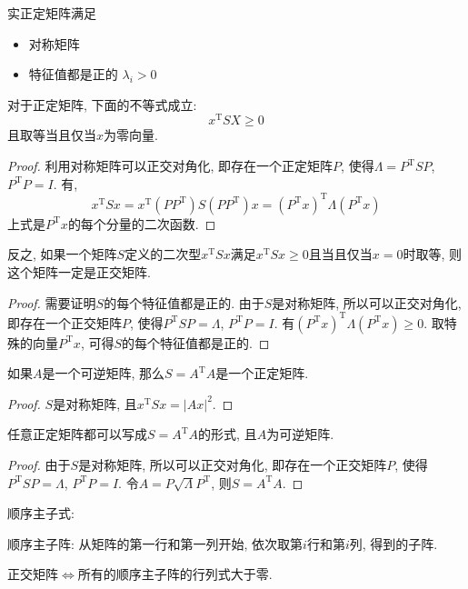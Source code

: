 
\begin{definition}
    实正定矩阵满足
    \begin{itemize}
        \item 对称矩阵
        \item 特征值都是正的 $\lambda_{i} > 0$
    \end{itemize}
\end{definition}

对于正定矩阵, 下面的不等式成立:
\begin{equation}
  x^{\mathrm{T}}SX \ge  0
\end{equation}
且取等当且仅当$x$为零向量.
\begin{proof}
    利用对称矩阵可以正交对角化, 即存在一个正定矩阵$P$, 使得$\Lambda = P^{\mathrm{T}}SP$, $P^{\mathrm{T}}P=I$.
    有,
    \begin{equation}
      x^{\mathrm{T}}Sx = x^{\mathrm{T}} \left( P P^{\mathrm{T}} \right) S \left( P P^{\mathrm{T}} \right) x = \left( P^{\mathrm{T}}x \right) ^{\mathrm{T}} \Lambda \left( P^{\mathrm{T}} x \right) 
    \end{equation}
    上式是$P^{\mathrm{T}}x$的每个分量的二次函数.
\end{proof}

反之, 如果一个矩阵$S$定义的二次型$x^{\mathrm{T}}Sx$满足$x^{\mathrm{T}}Sx \ge 0$且当且仅当$x=0$时取等, 则这个矩阵一定是正交矩阵.
\begin{proof}
    需要证明$S$的每个特征值都是正的. 由于$S$是对称矩阵, 所以可以正交对角化, 即存在一个正交矩阵$P$, 使得$P^{\mathrm{T}}SP = \Lambda$, $P^{\mathrm{T}}P=I$. 有$\left( P^{\mathrm{T}}x \right) ^{\mathrm{T}} \Lambda \left( P^{\mathrm{T}} x \right) \ge 0$. 取特殊的向量$
    P^{\mathrm{T}}x$, 可得$S$的每个特征值都是正的.
\end{proof}

\begin{proposition}
    如果$A$是一个可逆矩阵, 那么$S = A^{\mathrm{T}}A$是一个正定矩阵.
\end{proposition}
\begin{proof}
    $S$是对称矩阵, 且$x^{\mathrm{T}}Sx = \left| Ax \right| ^{2}$.
\end{proof}

\begin{proposition}
    任意正定矩阵都可以写成$S = A^{\mathrm{T}}A$的形式, 且$A$为可逆矩阵.
\end{proposition}
\begin{proof}
    由于$S$是对称矩阵, 所以可以正交对角化, 即存在一个正交矩阵$P$, 使得$P^{\mathrm{T}}SP = \Lambda$, $P^{\mathrm{T}}P=I$. 令$A = P \sqrt{\Lambda} P^{\mathrm{T}}$, 则$S = A^{\mathrm{T}}A$.
\end{proof}
顺序主子式:

\begin{definition}
    顺序主子阵: 从矩阵的第一行和第一列开始, 依次取第$i$行和第$i$列, 得到的子阵.
\end{definition}

\begin{proposition}
    正交矩阵$\iff$所有的顺序主子阵的行列式大于零.
\end{proposition}

